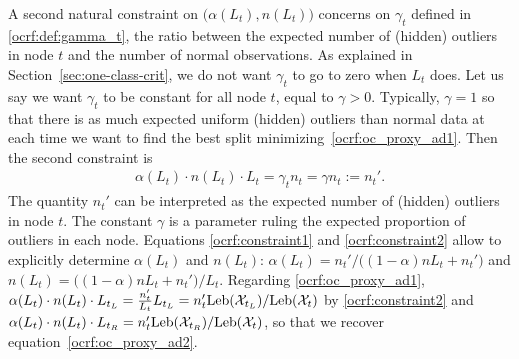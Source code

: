 A second natural constraint on $\big(\alpha(L_t), n(L_t)\big)$
concerns on $\gamma_t$ defined in \eqref{ocrf:def:gamma_t},
the ratio between the expected number of (hidden) outliers in node $t$ and the number of normal observations.
As explained in Section~\ref{sec:one-class-crit}, we do not want $\gamma_t$ to go to zero when $L_t$ does.
Let us say we want $\gamma_t$ to be constant for all node $t$, equal to $\gamma>0$. Typically, $\gamma=1$ so that there is as much expected uniform (hidden) outliers than normal data at each time we want to find the best split minimizing~\eqref{ocrf:oc_proxy_ad1}. Then the second constraint is %
\begin{align}
\label{ocrf:constraint2}
\alpha(L_t) \cdot n(L_t) \cdot L_t = \gamma_t n_t = \gamma n_t:=n_t'.
\end{align}
The quantity $n_t'$ can be interpreted as the expected number of (hidden) outliers in node $t$. The constant $\gamma$ is a parameter ruling the expected proportion of outliers in each node.
%
Equations \eqref{ocrf:constraint1} and \eqref{ocrf:constraint2} allow to explicitly determine $\alpha(L_t)$ and $n(L_t)$: $\alpha(L_t) = n_t'/\big((1-\alpha)nL_t + n_t'\big)$ and $n(L_t) = \big((1-\alpha)nL_t + n_t'\big)/L_t$.
Regarding \eqref{ocrf:oc_proxy_ad1}, $\alpha(L_t) \cdot n(L_t) \cdot L_{t_L} = \frac{n_t'}{L_t} L_{t_L} = n_t'\text{Leb}(\mathcal{X}_{t_L})/ \text{Leb}(\mathcal{X}_{t})$ by \eqref{ocrf:constraint2} and $\alpha(L_t) \cdot n(L_t) \cdot L_{t_R}  = n_t'\text{Leb}(\mathcal{X}_{t_R})/\text{Leb}(\mathcal{X}_{t})$, so that
we recover equation~\eqref{ocrf:oc_proxy_ad2}.

